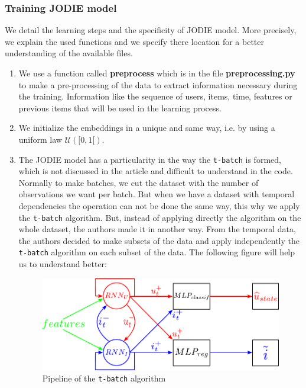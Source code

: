 \subsubsection{Training JODIE model} 

We detail the learning steps and the specificity of JODIE model. More precisely, we explain the used functions and we specify there location for a better understanding of the available files.

\begin{enumerate}
    \item We use a function called \textbf{preprocess} which is in the file \textbf{preprocessing.py} to make a pre-processing of the data to extract information necessary during the training. Information like the sequence of users, items, time, features or previous items that will be used in the learning process.
    \item We initialize the embeddings in a unique and same way, i.e. by using a uniform law $\mathcal{U}([0,1[)$.
    \item The JODIE model has a particularity in the way the \texttt{t-batch} is formed, which is not discussed in the article and difficult to understand in the code. Normally to make batches, we cut the dataset with the number of observations we want per batch. But when we have a dataset with temporal dependencies the operation can not be done the same way, this why we apply the \texttt{t-batch} algorithm. But, instead of applying directly the algorithm on the whole dataset, the authors made it in another way. From the temporal data, the authors decided to make subsets of the data and apply independently the \texttt{t-batch} algorithm on each subset of the data. The following figure will help us to understand better:
    \begin{figure}[H]
        \centering
        \includegraphics[scale = 0.43]{image/pipeline.pdf}
        \caption{Pipeline of the \texttt{t-batch} algorithm}
        \label{pipeline_t-batch}
    \end{figure}

\end{enumerate}
